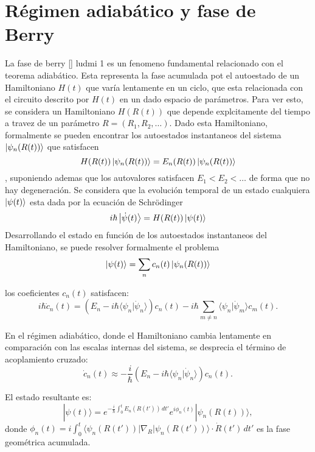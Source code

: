 \section{R\'egimen adiab\'atico y fase de Berry} \label{sec2:adiabatico}
La fase de berry \ref{} ludmi 1 es un fenomeno fundamental relacionado con el teorema adiab\'atico. Esta representa la fase acumulada pot el autoestado de un Hamiltoniano $H(t)$ que var\'ia lentamente en un ciclo, que esta relacionada con el circuito descrito por $H(t)$ en un dado espacio de par\'ametros. \newline
Para ver esto, se considera un Hamiltoniano $H(R(t))$ que depende explcitamente del tiempo a travez de un parámetro $R=(R_1,R_2,\dots)$. Dado esta Hamiltoniano, formalmente se pueden encontrar los autoestados instantaneos del sistema $\ket{\psi_n(R(t))}$ que satisfacen
\begin{equation}
    H(R(t))\ket{\psi_n(R(t))}=E_n(R(t))\ket{\psi_n(R(t))}
\end{equation}
, suponiendo ademas que los autovalores satisfacen $E_1<E_2<\dots$ de forma que no hay degeneraci\'on. Se considera que la evoluci\'on temporal de un estado cualquiera $\ket{\psi(t)}$ esta dada por la ecuación de Schr\"odinger
\begin{equation}
    i \hbar \ket{\dot \psi(t)}=H(R(t))\ket{\psi(t)}
\end{equation}
Desarrollando el estado en funci\'on de los autoestados instantaneos del Hamiltoniano, se puede resolver formalmente el problema
\begin{equation}
    \ket{\psi(t)} = \sum_n c_n(t)\ket{\psi_n(R(t))}
\end{equation}

los coeficientes \( c_n(t) \) satisfacen:
\[
i \hbar \dot{c}_n(t) = \left( E_n - i \hbar \langle \psi_n | \dot{\psi}_n \rangle \right) c_n(t) - i \hbar \sum_{m \neq n} \langle \psi_n | \dot{\psi}_m \rangle c_m(t).
\]

En el régimen adiabático, donde el Hamiltoniano cambia lentamente en comparación con las escalas internas del sistema, se desprecia el término de acoplamiento cruzado:
\[
\dot{c}_n(t) \approx -\frac{i}{\hbar} \left( E_n - i \hbar \langle \psi_n | \dot{\psi}_n \rangle \right) c_n(t).
\]

El estado resultante es:
\[
| \psi(t) \rangle = e^{-\frac{i}{\hbar} \int_0^t E_n(R(t')) \, dt'} e^{i \phi_n(t)} | \psi_n(R(t)) \rangle,
\]
donde \( \phi_n(t) = i \int_0^t \langle \psi_n(R(t')) | \nabla_R | \psi_n(R(t')) \rangle \cdot \dot{R}(t') \, dt' \) es la fase geométrica acumulada.

